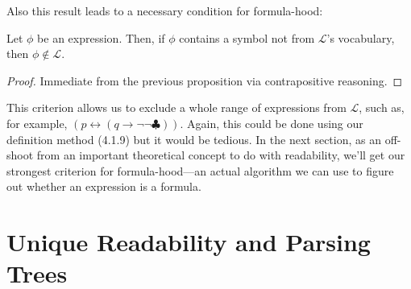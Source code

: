 \begin{enumerate}[\thesection.1]
	Also this result leads to a necessary condition for formula-hood:
	
	\begin{corollary}
	Let $\phi$ be an expression. Then, if $\phi$ contains a symbol not from $\mathcal{L}$'s vocabulary, then $\phi\notin\mathcal{L}$.
	\end{corollary}
	\begin{proof}
	Immediate from the previous proposition via contrapositive reasoning.
	\end{proof}
	
	This criterion allows us to exclude a whole range of expressions from $\mathcal{L}$, such as, for example, $(p\leftrightarrow (q\to \neg\neg\clubsuit))$. Again, this could be done using our definition method (4.1.9) but it would be tedious. In the next section, as an off-shoot from an important theoretical concept to do with readability, we'll get our strongest criterion for formula-hood---an actual algorithm we can use to figure out whether an expression is a formula.
			
	\end{enumerate}

\section{Unique Readability and Parsing Trees}

